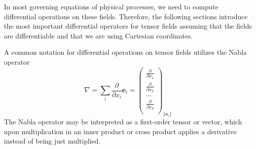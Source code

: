In most governing equations of physical processes, we need to compute differential operations on these fields. Therefore, the following sections introduce the most important differential operators for tensor fields assuming that the fields are differentiable and that we are using Cartesian coordinates. 

A common notation for differential operations on tensor fields utilizes the Nabla operator 
\begin{equation}
    \nabla = \sum_i \frac{\partial }{\partial x_i} \mathbf{e}_i = 
    \begin{pmatrix}
            \frac{\partial}{\partial x_1} \\
            \frac{\partial}{\partial x_2} \\
            \dots \\
            \frac{\partial}{\partial x_d} \\
        \end{pmatrix}_{\{\mathbf{e}_i\}}
\end{equation}
The Nabla operator may be interpreted as a first-order tensor or vector, which upon multiplication in an inner product or cross product applies a derivative instead of being just multiplied. 

